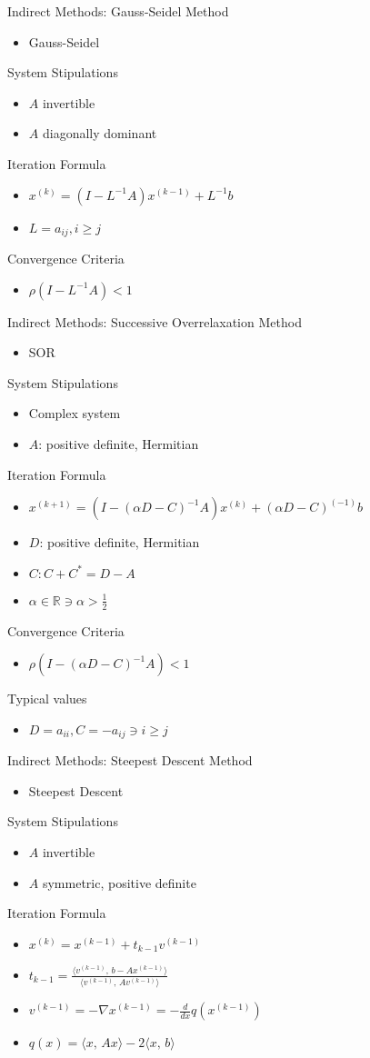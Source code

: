 \documentclass[9pt, serif]{beamer}
\newlength{\wideitemsep}
\let\olditem\item
\renewcommand{\item}{\setlength{\itemsep}{\wideitemsep}\olditem}
\newcommand{\bi}{\begin{itemize}}
\newcommand{\ei}{\end{itemize}}
\begin{document}
\begin{frame}{Indirect Methods: Gauss-Seidel}
    Method
    \bi
        \item Gauss-Seidel
    \ei
    System Stipulations
    \bi
        \item $A$ invertible
        \item $A$ diagonally dominant
    \ei
    Iteration Formula
    \bi
        \item $x^{(k)} = (I-L^{-1}A)x^{(k-1)}+L^{-1}b$
        \item $L = a_{ij}, i \ge j$ 
    \ei
    Convergence Criteria
    \bi
        \item $\rho(I-L^{-1}A)<1$
    \ei
\end{frame}


\begin{frame}{Indirect Methods: Successive Overrelaxation}
    Method
    \bi
        \item SOR
    \ei
    System Stipulations
    \bi
        \item Complex system
        \item $A$: positive definite, Hermitian
    \ei
    Iteration Formula
    \bi
        \item $x^{(k+1)}=(I-(\alpha D-C)^{-1}A)x^{(k)}+(\alpha D-C)^{(-1)}b$
        \item $D$: positive definite, Hermitian
        \item $C: C+C^*=D-A$
        \item $\alpha\in\mathbb{R} \ni \alpha>\frac{1}{2}$
    \ei
    Convergence Criteria
    \bi
        \item $\rho(I-(\alpha D-C)^{-1}A)<1$
    \ei
    Typical values
    \bi
        \item $D = a_{ii}, C = -a_{ij} \ni i \ge j$
    \ei
\end{frame}


\begin{frame}{Indirect Methods: Steepest Descent}
    Method
    \bi
        \item Steepest Descent
    \ei
    System Stipulations
    \bi
        \item $A$ invertible
        \item $A$ symmetric, positive definite
    \ei
    Iteration Formula
    \bi
        \item $x^{(k)} = x^{(k-1)}+t_{k-1}v^{(k-1)}$
        \item $t_{k-1} = \frac{\langle v^{(k-1)},\, b - Ax^{(k-1)}\rangle}{\langle v^{(k-1)},\, Av^{(k-1)} \rangle}$
        \item $v^{(k-1)} = -\nabla x^{(k-1)} = -\frac{d}{dx} q(x^{(k-1)})$
        \item $q(x) = \langle x,\, Ax \rangle - 2 \langle x,\, b \rangle$
    \ei
\end{frame}
\end{document}
